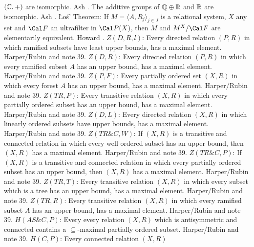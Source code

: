 $({\Bbb C},+)$ are  isomorphic.  \ac{Ash} \cite{1975}.
\medskip
{} The additive groups of $\Bbb Q\oplus\Bbb R$
and $\Bbb R$ are isomorphic.  \ac{Ash} \cite{1975}.
\medskip
{} \L o\'s' Theorem: If $M=\langle A,R_j\rangle_{j\in
J}$ is a relational system, $X$ any set and ${\Cal F}$ an ultrafilter
in ${\Cal P}(X)$, then $M$ and $M^{X}/{\Cal F}$ are elementarily
equivalent.  \ac{Howard} \cite{1975}. 
\medskip
{} $Z(D,R,l)$: Every directed relation $(P,R)$ in which
ramified subsets have least upper bounds, has a maximal element.
\ac{Harper/Rubin} \cite{1976} and note 39.
\medskip
{} $Z(D,R)$: Every directed relation $(P,R)$ in which
every ramified subset $A$ has an upper bound, has a maximal element.
\ac{Harper/Rubin}  \cite{1976} and note 39.
\medskip
{} $Z(P,F)$: Every partially ordered set $(X,R)$ in
which every forest $A$ has an upper bound, has a maximal element.
\ac{Harper/Rubin} \cite{1976} and note 39.
\medskip
{} $Z(TR,P)$: Every transitive relation $(X,R)$ in
which  every partially ordered subset has an upper bound, has a maximal
element.  \ac{Harper/Rubin} \cite{1976} and note 39.
\medskip
{} $Z(D,L)$: Every directed relation $(X,R)$ in which
linearly ordered subsets have upper bounds, has a maximal element.
\ac{Harper/Rubin} \cite{1976} and note 39.
\medskip
{} $Z(TR\&C,W)$: If $(X,R)$ is a transitive and
connected relation in which every well ordered subset has an upper
bound, then $(X,R)$ has a maximal element.  \ac{Harper/Rubin} \cite{1976}
and note 39.
\medskip
{} $Z(TR\&C,P)$: If $(X,R)$ is a transitive and
connected relation in which every partially ordered subset has an
upper bound, then $(X,R)$ has a maximal element. \ac{Harper/Rubin}
\cite{1976} and note 39.
\medskip
{} $Z(TR,T)$: Every transitive relation $(X,R)$ in
which every subset which is a tree has an upper bound, has a maximal
element. \ac{Harper/Rubin} \cite{1976} and note 39.
\medskip
{} $Z(TR,R)$: Every transitive relation $(X,R)$ in
which every ramified subset $A$ has an upper bound, has a maximal element.
\ac{Harper/Rubin} \cite{1976} and note 39.
\medskip
{} $H(AS\&C,P)$: Every every relation $(X,R)$ which is
antisymmetric and connected contains a $\subseteq$-maximal partially
ordered subset.  \ac{Harper/Rubin} \cite{1976} and note 39.
\medskip
{} $H(C,P)$: Every connected relation $(X,R)$
